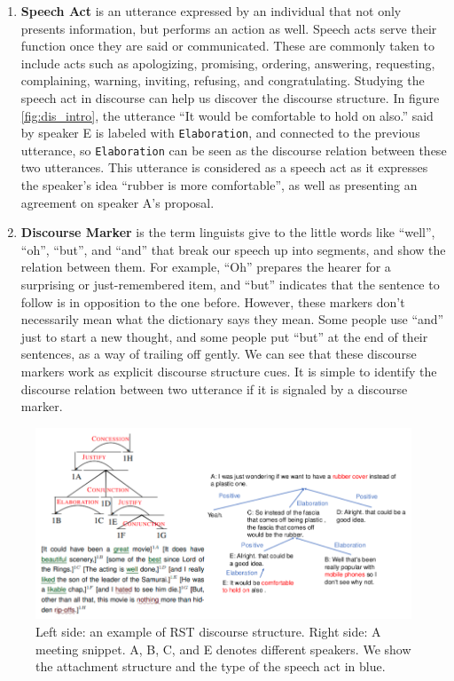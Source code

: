 \begin{enumerate}
    \item \textbf{Speech Act} is an utterance expressed by an individual that not only presents information, but performs an action as well. %
    Speech acts serve their function once they are said or communicated. These are commonly taken to include acts such as apologizing, promising, ordering, answering, requesting, complaining, warning, inviting, refusing, and congratulating. Studying the speech act in discourse can help us discover the discourse structure. In figure \ref{fig:dis_intro}, the utterance ``It would be comfortable to hold on also.'' said by speaker E is labeled with \texttt{Elaboration}, and connected to the previous utterance, so \texttt{Elaboration} can be seen as the discourse relation between these two utterances. This utterance is considered as a speech act as it expresses the speaker's idea ``rubber is more comfortable'', as well as presenting an agreement on speaker A's proposal.
    
    \item \textbf{Discourse Marker} is the term linguists give to the little words like ``well'', ``oh'', ``but'', and ``and'' that break our speech up into segments, and show the relation between them. For example, ``Oh'' prepares the hearer for a surprising or just-remembered item, and ``but'' indicates that the sentence to follow is in opposition to the one before. However, these markers don't necessarily mean what the dictionary says they mean. Some people use ``and'' just to start a new thought, and some people put ``but'' at the end of their sentences, as a way of trailing off gently. We can see that these discourse markers work as explicit discourse structure cues. It is simple to identify the discourse relation between two utterance if it is signaled by a discourse marker. %
\end{enumerate}

\begin{figure}[t] 
\centering
\includegraphics[width=1.0\columnwidth]{Images/dis_intro.png} 
  \caption{Left side: an example of RST discourse structure. Right side:  A meeting snippet. A, B, C, and E denotes different speakers. We show the attachment structure and the type of the speech act in blue.}
\end{figure}\label{fig:dis_intro} 

